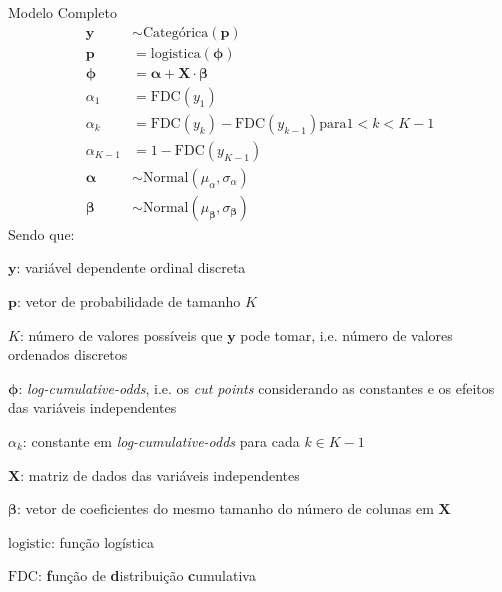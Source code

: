 \begin{frame}{Modelo Completo}
	\footnotesize
	$$
		\begin{aligned}
			\mathbf{y}          & \sim \text{Categórica}(\mathbf{p})                                        \\
			\mathbf{p}          & = \mathrm{logistica}(\boldsymbol{\phi})                                   \\
			\boldsymbol{\phi}   & = \boldsymbol{\alpha} + \mathbf{X} \cdot \boldsymbol{\beta}               \\
			\alpha_1            & = \mathrm{FDC}(y_1)                                                       \\
			\alpha_k            & = \mathrm{FDC}(y_k) - \mathrm{FDC}(y_{k-1}) \mathrm{ para } 1 < k < K-1   \\
			\alpha_{K-1}        & = 1 - \mathrm{FDC}(y_{K-1})                                               \\
			\boldsymbol{\alpha} & \sim \text{Normal}(\mu_\alpha, \sigma_\alpha)                             \\
			\boldsymbol{\beta}  & \sim \text{Normal}(\mu_{\boldsymbol{\beta}}, \sigma_{\boldsymbol{\beta}})
		\end{aligned}
	$$
	Sendo que:
	\begin{vfilleditems}
		\item \footnotesize  $\mathbf{y}$: variável dependente ordinal discreta
		\item \footnotesize  $\mathbf{p}$: vetor de probabilidade de tamanho $K$
		\item \footnotesize  $K$: número de valores possíveis que $\mathbf{y}$ pode tomar, i.e. número de valores ordenados discretos
		\item \footnotesize  $\boldsymbol{\phi}$: \textit{log-cumulative-odds}, i.e. os \textit{cut points} considerando as constantes e os efeitos das variáveis independentes
		\item \footnotesize  $\alpha_k$: constante em \textit{log-cumulative-odds} para cada $k \in K-1$
		\item \footnotesize  $\mathbf{X}$: matriz de dados das variáveis independentes
		\item \footnotesize  $\boldsymbol{\beta}$: vetor de coeficientes do mesmo tamanho do número de colunas em $\mathbf{X}$
		\item \footnotesize  $\mathrm{logistic}$: função logística
		\item \footnotesize  $\mathrm{FDC}$: \textbf{f}unção de \textbf{d}istribuição \textbf{c}umulativa
	\end{vfilleditems}
\end{frame}


